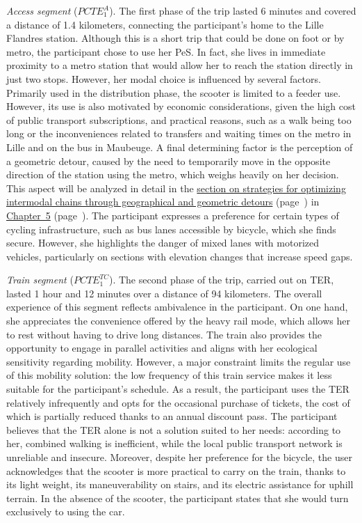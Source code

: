 \begin{refsegment}
\textsl{Access segment} (\(PCTE^{A}_{1}\)). The first phase of the trip lasted 6 minutes and covered a distance of 1.4 kilometers, connecting the participant's home to the Lille Flandres station. Although this is a short trip that could be done on foot or by metro, the participant chose to use her \acrshort{PeS}. In fact, she lives in immediate proximity to a metro station that would allow her to reach the station directly in just two stops. However, her modal choice is influenced by several factors. Primarily used in the distribution phase, the scooter is limited to a feeder use. However, its use is also motivated by economic considerations, given the high cost of public transport subscriptions, and practical reasons, such as a walk being too long or the inconveniences related to transfers and waiting times on the metro in Lille and on the bus in Maubeuge. A final determining factor is the perception of a geometric \gls{detour}, caused by the need to temporarily move in the opposite direction of the station using the metro, which weighs heavily on her decision. This aspect will be analyzed in detail in the \hyperref[chap5:detours-pauses-optimisation]{section on strategies for optimizing intermodal chains through geographical and geometric detours} (page~\pageref{chap5:detours-pauses-optimisation}) in \hyperref[chap5:titre]{Chapter~5} (page~\pageref{chap5:titre}). The participant expresses a preference for certain types of cycling infrastructure, such as bus lanes accessible by bicycle, which she finds secure. However, she highlights the danger of mixed lanes with motorized vehicles, particularly on sections with elevation changes that increase speed gaps.%

\textsl{Train segment} (\(PCTE^{TC}_{1}\)). The second phase of the trip, carried out on \acrshort{TER}, lasted 1 hour and 12 minutes over a distance of 94 kilometers. The overall experience of this segment reflects ambivalence in the participant. On one hand, she appreciates the convenience offered by the heavy rail mode, which allows her to rest without having to drive long distances. The train also provides the opportunity to engage in parallel activities and aligns with her ecological sensitivity regarding mobility. However, a major constraint limits the regular use of this mobility solution: the low frequency of this train service makes it less suitable for the participant's schedule. As a result, the participant uses the \acrshort{TER} relatively infrequently and opts for the occasional purchase of tickets, the cost of which is partially reduced thanks to an annual discount pass. The participant believes that the \acrshort{TER} alone is not a solution suited to her needs: according to her, combined walking is inefficient, while the local public transport network is unreliable and insecure. Moreover, despite her preference for the bicycle, the user acknowledges that the scooter is more practical to carry on the train, thanks to its light weight, its maneuverability on stairs, and its electric assistance for uphill terrain. In the absence of the scooter, the participant states that she would turn exclusively to using the car.%


\end{refsegment}
